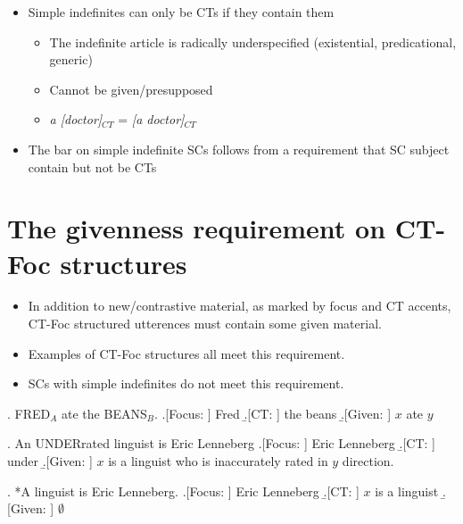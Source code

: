 \documentclass[GPFinal]{subfiles}
\begin{document}
\begin{itemize}
  \item Simple indefinites can only be CTs if they contain them 
    \begin{itemize}
      \item The indefinite article is radically underspecified (existential, predicational, generic)
      \item Cannot be given/presupposed
      \item \textit{a [doctor]}$_{CT}$ = \textit{[a doctor]}$_{CT}$
    \end{itemize}
  \item The bar on simple indefinite SCs follows from a requirement that SC subject contain but not be CTs
\end{itemize}
\section{The givenness requirement on CT-Foc structures}
\begin{itemize}
  \item In addition to new/contrastive material, as marked by focus and CT accents, CT-Foc structured utterences must contain some given material.
  \item Examples of CT-Foc structures all meet this requirement.
  \item SCs with simple indefinites do not meet this requirement.
\end{itemize}
\ex. FRED$_A$ ate the BEANS$_B$.
\a.[Focus: ] Fred
\b.[CT: ] the beans
\b.[Given: ] $x$ ate $y$

\ex. An UNDERrated linguist is Eric Lenneberg
\a.[Focus: ] Eric Lenneberg
\b.[CT: ] under
\b.[Given: ] $x$ is a linguist who is inaccurately rated in $y$ direction.

\ex. *A linguist is Eric Lenneberg.
\a.[Focus: ] Eric Lenneberg
\b.[CT: ] $x$ is a linguist
\b.[Given: ] $\emptyset$
\end{document}
